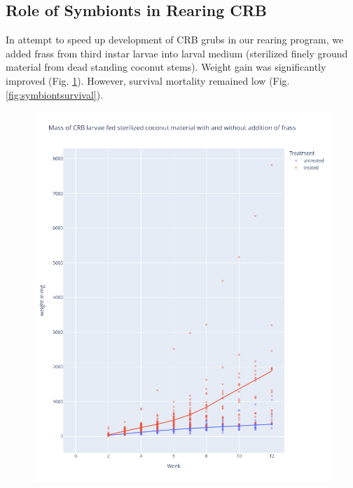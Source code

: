 \documentclass[12pt,letterpaper,english,bibliography=totocnumbered, abstract=on]{scrartcl}
\begin{document}
\clearpage
\subsection{Role of Symbionts in Rearing CRB}

In attempt to speed up development of CRB grubs in our rearing program, we added frass from third instar larvae into larval medium (sterilized finely ground material from dead standing coconut stems). Weight gain was significantly improved (Fig. \ref{fig:symbiontmass}). However, survival mortality remained low (Fig. \ref{fig:symbiontsurvival}).



\begin{figure}[H]
	\centering
	\includegraphics[width=0.8\linewidth]{images/symbiont_mass}
	\caption{}
	\label{fig:symbiontmass}
\end{figure}
\end{document}
